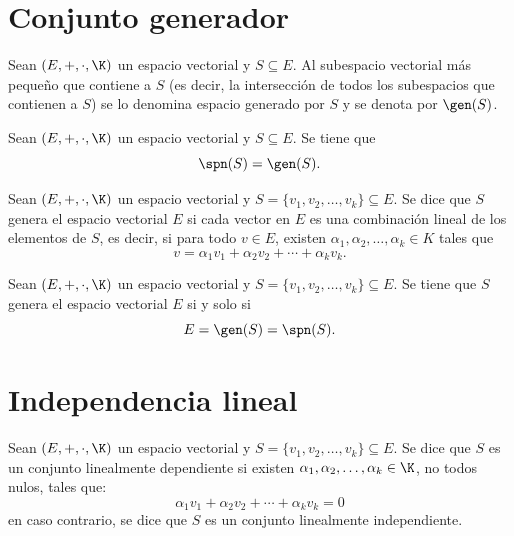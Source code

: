 \documentclass[a4,11pt]{aleph-notas}
\begin{document}
\encabezado

\section{Conjunto generador}

\begin{defi}
    Sean $(E,+,\cdot,\K)$ un espacio vectorial y $S\subseteq E$. Al subespacio vectorial más pequeño que contiene a $S$ (es decir, la intersección de todos los subespacios que contienen a $S$) se lo denomina espacio generado por $S$ y se denota por $\gen(S)$.
\end{defi}

\begin{teo}
    Sean $(E,+,\cdot,\K)$ un espacio vectorial y $S\subseteq E$. Se tiene que
    \[
        \spn(S)=\gen(S).
    \]
\end{teo}


\begin{defi}
    Sean $(E,+,\cdot,\K)$ un espacio vectorial y $S=\{v_1,v_2,\ldots,v_k\}\subseteq E$. Se dice que $S$ genera el espacio vectorial $E$ si cada vector en $E$ es una combinación lineal de los elementos de $S$, es decir, si para todo $v\in E$, existen $\alpha_1, \alpha_2, \ldots, \alpha_k\in K$ tales que
    \[
        v = \alpha_1v_1+ \alpha_2v_2+ \cdots+ \alpha_k v_k.
    \]
\end{defi}


\begin{teo}
    Sean $(E,+,\cdot,\K)$ un espacio vectorial y $S=\{v_1,v_2,\ldots,v_k\}\subseteq E$. Se tiene que $S$ genera el espacio vectorial $E$ si y solo si
    \[
        E = \gen(S) = \spn(S).
    \]
\end{teo}

\section{Independencia lineal}

\begin{defi}
    Sean $(E,+,\cdot,\K)$ un espacio vectorial y $S=\{v_1,v_2,\ldots,v_k\}\subseteq E$. Se dice que $S$ es un conjunto linealmente dependiente si existen $\alpha_1, \alpha_2, \ldots, \alpha_k \in \K$, no todos nulos, tales que:
    \[
        \alpha_1 v_1 + \alpha_2 v_2 + \cdots + \alpha_k v_k = 0
    \]
    en caso contrario, se dice que $S$ es un conjunto linealmente independiente. 
\end{defi}
\end{document}

